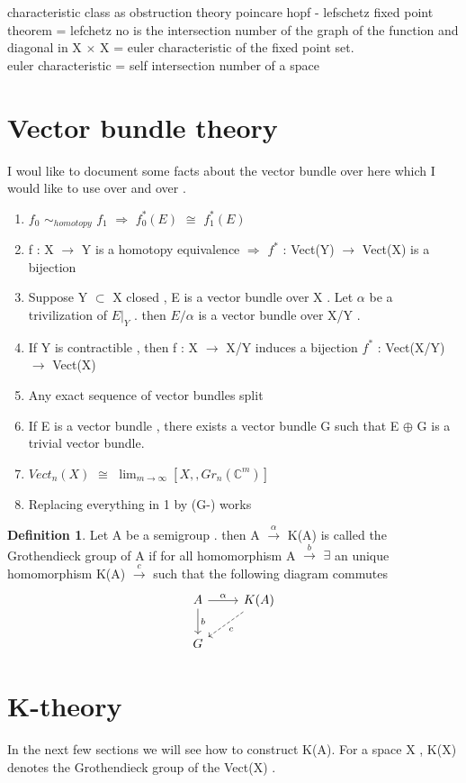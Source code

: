 \documentclass[psamsfonts]{amsart}
\theoremstyle{definition}
\newtheorem{defn}[thm]{Definition}
\theoremstyle{remark}
\numberwithin{equation}{section}
\begin{document}
characteristic class as obstruction theory
poincare hopf - lefschetz fixed point theorem = lefchetz no is the intersection number of the graph of the function and diagonal in X $\times$ X = euler characteristic of the fixed point set.\\ 
euler characteristic = self intersection number of a space





\section{Vector bundle theory}
I woul like to document some facts about the vector bundle over here which I would like to use over and over .
\begin{enumerate}
	\item $f_{0}$ $\sim_{homotopy}$ $f_{1}$ $\Rightarrow$ $f_{0}^{*}(E)$ $\cong$ $f_{1}^{*}(E)$
	\item f : X $\to$ Y is a homotopy equivalence $\Rightarrow$ $f^{*}$ : Vect(Y) $\to$ Vect(X) is a bijection
	\item Suppose Y $\subset$ X closed , E is a vector bundle over X . Let $\alpha$ be a trivilization of $E|_{Y}$ . then $E/\alpha$ is a vector bundle over X/Y .
	\item If Y is contractible , then f : X $\to$ X/Y induces a bijection $f^{*}$ : Vect(X/Y) $\to$ Vect(X)
	\item Any exact sequence of vector bundles split
	\item If E is a vector bundle , there exists a vector bundle G such that E $\oplus$ G is a trivial vector bundle.
	\item $Vect_{n}(X)$ $\cong$ $\lim_{m \to \infty}[X,,Gr_{n}(\mathbb{C}^{m})]$ 
	\item Replacing everything in 1 by (G-) works   
\end{enumerate} 
\begin{defn}
	Let A be a semigroup . then A $\xrightarrow{\alpha}$ K(A) is called the Grothendieck group of A if for all homomorphism A $\xrightarrow{b}$ $\exists$ an unique homomorphism K(A) $\xrightarrow{c}$ such that the following diagram commutes 
	\[
	\begin{tikzcd}
	A \arrow{r}{\alpha} \arrow{d}{b} & K(A) \arrow[ld,dashed,"c"] \\
	G
	\end{tikzcd}
	\]
	
\end{defn}
\section{K-theory}
In the next few sections we will see how to construct K(A). For a space X , K(X) denotes the Grothendieck group of the Vect(X) . 
\end{document}

